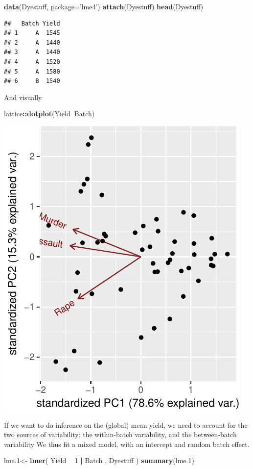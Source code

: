 \documentclass[]{book}
\newenvironment{Shaded}{\begin{snugshade}}{\end{snugshade}}
\newcommand{\DataTypeTok}[1]{\textcolor[rgb]{0.13,0.29,0.53}{#1}}
\newcommand{\DecValTok}[1]{\textcolor[rgb]{0.00,0.00,0.81}{#1}}
\newcommand{\FloatTok}[1]{\textcolor[rgb]{0.00,0.00,0.81}{#1}}
\newcommand{\KeywordTok}[1]{\textcolor[rgb]{0.13,0.29,0.53}{\textbf{#1}}}
\newcommand{\NormalTok}[1]{#1}
\newcommand{\OperatorTok}[1]{\textcolor[rgb]{0.81,0.36,0.00}{\textbf{#1}}}
\newcommand{\StringTok}[1]{\textcolor[rgb]{0.31,0.60,0.02}{#1}}
\theoremstyle{definition}
\theoremstyle{definition}
\theoremstyle{definition}
\theoremstyle{remark}
\begin{document}
\begin{Shaded}
\begin{Highlighting}[]
\KeywordTok{data}\NormalTok{(Dyestuff, }\DataTypeTok{package=}\StringTok{'lme4'}\NormalTok{)}
\KeywordTok{attach}\NormalTok{(Dyestuff)}
\KeywordTok{head}\NormalTok{(Dyestuff)}
\end{Highlighting}
\end{Shaded}

\begin{verbatim}
##   Batch Yield
## 1     A  1545
## 2     A  1440
## 3     A  1440
## 4     A  1520
## 5     A  1580
## 6     B  1540
\end{verbatim}

And visually

\begin{Shaded}
\begin{Highlighting}[]
\NormalTok{lattice}\OperatorTok{::}\KeywordTok{dotplot}\NormalTok{(Yield}\OperatorTok{~}\NormalTok{Batch)}
\end{Highlighting}
\end{Shaded}

\includegraphics[width=0.5\linewidth]{Rcourse_files/figure-latex/unnamed-chunk-199-1}

If we want to do inference on the (global) mean yield, we need to account for the two sources of variability: the within-batch variability, and the between-batch variability
We thus fit a mixed model, with an intercept and random batch effect.

\begin{Shaded}
\begin{Highlighting}[]
\NormalTok{lme}\FloatTok{.1}\NormalTok{<-}\StringTok{ }\KeywordTok{lmer}\NormalTok{( Yield }\OperatorTok{~}\StringTok{ }\DecValTok{1}  \OperatorTok{|}\StringTok{ }\NormalTok{Batch  , Dyestuff )}
\KeywordTok{summary}\NormalTok{(lme}\FloatTok{.1}\NormalTok{)}
\end{Highlighting}
\end{Shaded}
\end{document}
